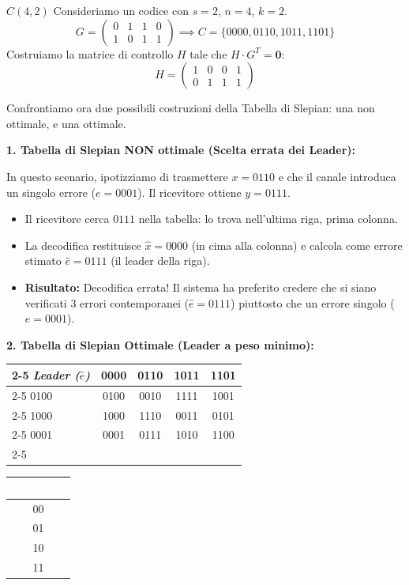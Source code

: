 \begin{esempio}{$C(4,2)$}
Consideriamo un codice con $s=2$, $n=4$, $k=2$.
\[
G=\begin{pmatrix}
    0 & 1 & 1 & 0\\
    1 & 0 & 1 & 1
\end{pmatrix}
\implies
C=\{0000, 0110, 1011, 1101\}
\]  
Costruiamo la matrice di controllo $H$ tale che $H \cdot G^T=\mathbf{0}$:
\[
H=\begin{pmatrix}
    1 & 0 & 0 & 1\\
    0 & 1 & 1 & 1
\end{pmatrix}
\] 

Confrontiamo ora due possibili costruzioni della Tabella di Slepian: una non ottimale, e una ottimale.

\vspace{0.5cm}
\textbf{1. Tabella di Slepian NON ottimale (Scelta errata dei Leader):}


In questo scenario, ipotizziamo di trasmettere $x=0110$ e che il canale introduca un singolo errore ($e=0001$). Il ricevitore ottiene \textbf{$y=0111$}.
\begin{itemize}
    \item Il ricevitore cerca $0111$ nella tabella: lo trova nell'ultima riga, prima colonna.
    \item La decodifica restituisce $\hat{x}=0000$ (in cima alla colonna) e calcola come errore stimato $\hat{e}=0111$ (il leader della riga).
    \item \textbf{Risultato:} Decodifica errata! Il sistema ha preferito credere che si siano verificati 3 errori contemporanei ($\hat{e}=0111$) piuttosto che un errore singolo ($e=0001$).
\end{itemize}

\vspace{0.5cm}
\textbf{2. Tabella di Slepian Ottimale (Leader a peso minimo):}
\begin{center}
\renewcommand{\arraystretch}{1.4}
\small
\begin{tabular}{l|c|c|c|c|}
    \cline{2-5}
    \rowcolor{white} \textit{Leader ($\hat{e}$)} & \textbf{0000} & \textbf{0110} & \textbf{1011} & \textbf{1101} \\ \cline{2-5}
    \rowcolor{rowblue} \cellcolor{white} 0100 & 0100 & 0010 & 1111 & 1001 \\ \cline{2-5}
    \rowcolor{white} 1000 & 1000 & 1110 & 0011 & 0101 \\ \cline{2-5}
    \rowcolor{rowblue} \cellcolor{white} 0001 & 0001 & 0111 & 1010 & 1100 \\ \cline{2-5}
\end{tabular}
\quad
\begin{tabular}{|c|}
    \hline
    \rowcolor{headerblue} \textcolor{white}{\textbf{Sindrome}} \\ \hline
    \rowcolor{white} 00 \\ \hline
    \rowcolor{rowblue} 01 \\ \hline
    \rowcolor{white} 10 \\ \hline
    \rowcolor{rowblue} 11 \\ \hline
\end{tabular}
\end{center}


\end{esempio}
